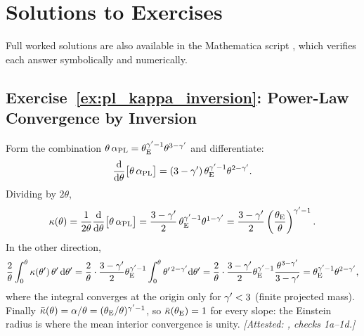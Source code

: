 
\section{Solutions to Exercises}
\label{sec:pl_solutions}

\noindent
Full worked solutions are also available in the Mathematica script
,
which verifies each answer symbolically and numerically.

\subsection*{Exercise~\ref{ex:pl_kappa_inversion}: Power-Law Convergence by Inversion}

Form the combination $\theta\,\alpha_{\rm PL}=\theta_{\mathrm{E}}^{\gamma'-1}\theta^{3-\gamma'}$ and differentiate:
\begin{equation*}
    \frac{\mathrm{d} }{\mathrm{d} \theta}\big[\theta\,\alpha_{\rm PL}\big]=(3-\gamma')\,\theta_{\mathrm{E}}^{\gamma'-1}\theta^{2-\gamma'} .
\end{equation*}
Dividing by $2\theta$,
\begin{equation*}
    \kappa(\theta)=\frac{1}{2\theta}\frac{\mathrm{d} }{\mathrm{d} \theta}\big[\theta\,\alpha_{\rm PL}\big]
      =\frac{3-\gamma'}{2}\,\theta_{\mathrm{E}}^{\gamma'-1}\theta^{1-\gamma'}
      =\frac{3-\gamma'}{2}\left(\frac{\theta_{\mathrm{E}}}{\theta}\right)^{\gamma'-1} .
\end{equation*}
In the other direction,
\begin{equation*}
    \frac{2}{\theta}\int_0^\theta\kappa(\theta')\,\theta'\,\dd\theta'
    =\frac{2}{\theta}\cdot\frac{3-\gamma'}{2}\theta_{\mathrm{E}}^{\gamma'-1}\int_0^\theta\theta'^{\,2-\gamma'}\dd\theta'
    =\frac{2}{\theta}\cdot\frac{3-\gamma'}{2}\theta_{\mathrm{E}}^{\gamma'-1}\frac{\theta^{3-\gamma'}}{3-\gamma'}
    =\theta_{\mathrm{E}}^{\gamma'-1}\theta^{2-\gamma'} ,
\end{equation*}
where the integral converges at the origin only for $\gamma'<3$ (finite
projected mass).  Finally $\bar\kappa(\theta)=\alpha/\theta=(\theta_{\mathrm{E}}/\theta)^{\gamma'-1}$,
so $\bar\kappa(\theta_{\mathrm{E}})=1$ for every slope: the Einstein radius is
where the mean interior convergence is unity.
\emph{[Attested: , checks 1a--1d.]}

